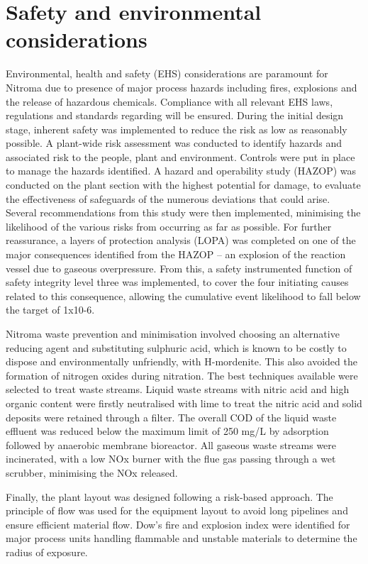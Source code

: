 \section*{Safety and environmental considerations}

Environmental, health and safety (EHS) considerations are paramount for Nitroma due to presence of major process hazards including fires, explosions and the release of hazardous chemicals. Compliance with all relevant EHS laws, regulations and standards regarding will be ensured.  During the initial design stage, inherent safety was implemented to reduce the risk as low as reasonably possible. A plant-wide risk assessment was conducted to identify hazards and associated risk to the people, plant and environment. Controls were put in place to manage the hazards identified. A hazard and operability study (HAZOP) was conducted on the plant section with the highest potential for damage, to evaluate the effectiveness of safeguards of the numerous deviations that could arise. Several recommendations from this study were then implemented, minimising the likelihood of the various risks from occurring as far as possible. For further reassurance, a layers of protection analysis (LOPA) was completed on one of the major consequences identified from the HAZOP – an explosion of the reaction vessel due to gaseous overpressure.  From this, a safety instrumented function of safety integrity level three was implemented, to cover the four initiating causes related to this consequence, allowing the cumulative event likelihood to fall below the target of 1x10-6.  

Nitroma waste prevention and minimisation involved choosing an alternative reducing agent and substituting sulphuric acid, which is known to be costly to dispose and environmentally unfriendly, with H-mordenite. This also avoided the formation of nitrogen oxides during nitration. The best techniques available were selected to treat waste streams. Liquid waste streams with nitric acid and high organic content were firstly neutralised with lime to treat the nitric acid and solid deposits were retained through a filter. The overall COD of the liquid waste effluent was reduced below the maximum limit of 250 mg/L by adsorption followed by anaerobic membrane bioreactor. All gaseous waste streams were incinerated, with a low NOx burner with the flue gas passing through a wet scrubber, minimising the NOx released. 

Finally, the plant layout was designed following a risk-based approach. The principle of flow was used for the equipment layout to avoid long pipelines and ensure efficient material flow. Dow’s fire and explosion index were identified for major process units handling flammable and unstable materials to determine the radius of exposure.  